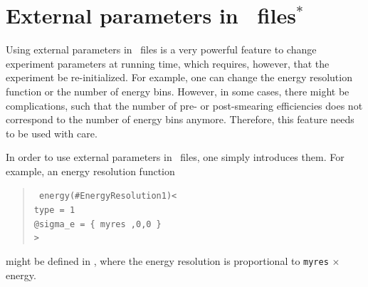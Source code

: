 \section{External parameters in \AEDL\ files$^*$}
\label{sec:aedlparams}

Using external parameters in \AEDL\ files is a very powerful feature
to change experiment parameters at running time, which requires, however, that
the experiment be re-initialized. For example, one can change the
energy resolution function or the number of energy bins. However,
in some cases, there might be complications, such that the number
of pre- or post-smearing efficiencies does not correspond to the number
of energy bins anymore. Therefore, this feature needs to be 
used with care.

In order to use external parameters in \AEDL\ files, one simply
introduces them. For example, an energy resolution function
\begin{quote}
{\tt
energy(\#EnergyResolution1)< \\
\hspace*{1cm} type = 1 \\
\hspace*{1cm} @sigma\_e = \{ myres ,0,0 \} \\
> \\
}
\end{quote}
might be defined in \AEDL , where the energy resolution is proportional
to {\tt myres} $\times$ energy. 

